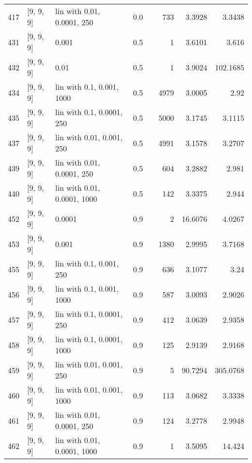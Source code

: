 \begin{longtable}{lllrrrrr}
  417 &          [9, 9, 9] &  lin with 0.01, 0.0001, 250 &      0.0 &     &  733 &   3.3928 &   3.3438 \\
  431 &          [9, 9, 9] &                       0.001 &      0.5 &     &    1 &   3.6101 &    3.616 \\
  432 &          [9, 9, 9] &                        0.01 &      0.5 &     &    1 &   3.9024 & 102.1685 \\
  434 &          [9, 9, 9] &   lin with 0.1, 0.001, 1000 &      0.5 &     & 4979 &   3.0005 &     2.92 \\
  435 &          [9, 9, 9] &   lin with 0.1, 0.0001, 250 &      0.5 &     & 5000 &   3.1745 &   3.1115 \\
  437 &          [9, 9, 9] &   lin with 0.01, 0.001, 250 &      0.5 &     & 4991 &   3.1578 &   3.2707 \\
  439 &          [9, 9, 9] &  lin with 0.01, 0.0001, 250 &      0.5 &     &  604 &   3.2882 &    2.981 \\
  440 &          [9, 9, 9] & lin with 0.01, 0.0001, 1000 &      0.5 &     &  142 &   3.3375 &    2.944 \\
  452 &          [9, 9, 9] &                      0.0001 &      0.9 &     &    2 &  16.6076 &   4.0267 \\
  453 &          [9, 9, 9] &                       0.001 &      0.9 &     & 1380 &   2.9995 &   3.7168 \\
  455 &          [9, 9, 9] &    lin with 0.1, 0.001, 250 &      0.9 &     &  636 &   3.1077 &     3.24 \\
  456 &          [9, 9, 9] &   lin with 0.1, 0.001, 1000 &      0.9 &     &  587 &   3.0093 &   2.9026 \\
  457 &          [9, 9, 9] &   lin with 0.1, 0.0001, 250 &      0.9 &     &  412 &   3.0639 &   2.9358 \\
  458 &          [9, 9, 9] &  lin with 0.1, 0.0001, 1000 &      0.9 &     &  125 &   2.9139 &   2.9168 \\
  459 &          [9, 9, 9] &   lin with 0.01, 0.001, 250 &      0.9 &     &    5 &  90.7294 & 305.0768 \\
  460 &          [9, 9, 9] &  lin with 0.01, 0.001, 1000 &      0.9 &     &  113 &   3.0682 &   3.3338 \\
  461 &          [9, 9, 9] &  lin with 0.01, 0.0001, 250 &      0.9 &     &  124 &   3.2778 &   2.9948 \\
  462 &          [9, 9, 9] & lin with 0.01, 0.0001, 1000 &      0.9 &     &    1 &   3.5095 &   14.424 \\

\end{longtable}
